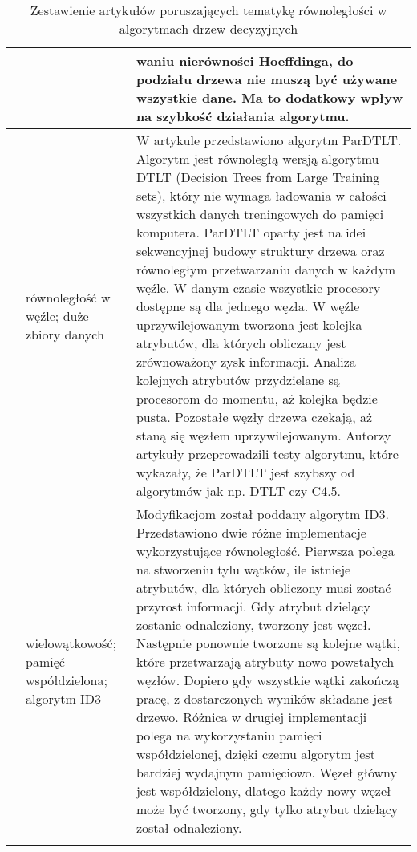 \documentclass[12pt]{article}
\begin{document}
\begin{center}
\begin{longtable}{| c | p{} | p{} |}
            & 

            &
            waniu nierówności Hoeffdinga, do podziału drzewa nie muszą być
            używane wszystkie dane. Ma to dodatkowy wpływ na szybkość działania algorytmu. \\
            
            \hline

            \cite{parallel-algorithm-to-induce-decision-trees} &

            równoległość w węźle; duże zbiory danych &

            W artykule przedstawiono algorytm ParDTLT. Algorytm jest równoległą wersją algorytmu
            DTLT (Decision Trees from Large Training sets), który nie wymaga ładowania w całości wszystkich danych
            treningowych do pamięci komputera. ParDTLT oparty jest na idei sekwencyjnej budowy struktury
            drzewa oraz równoległym przetwarzaniu danych w każdym węźle. W danym czasie wszystkie procesory
            dostępne są dla jednego węzła. W węźle uprzywilejowanym tworzona jest kolejka atrybutów, dla
            których obliczany jest zrównoważony zysk informacji. Analiza kolejnych
            atrybutów przydzielane są procesorom do momentu, aż kolejka będzie pusta. Pozostałe węzły drzewa czekają, aż
            staną się węzłem uprzywilejowanym. Autorzy artykuły przeprowadzili testy algorytmu, które wykazały, że
            ParDTLT jest szybszy od algorytmów jak np. DTLT czy C4.5. \\

            \hline

            \cite{improved-id3-decision-tree} &

            wielowątkowość; pamięć \newline współdzielona; algorytm ID3 &

            Modyfikacjom został poddany algorytm ID3. Przedstawiono dwie różne implementacje wykorzystujące równoległość.
            Pierwsza polega na stworzeniu tylu wątków, ile istnieje atrybutów, dla których obliczony musi zostać
            przyrost informacji. Gdy atrybut dzielący zostanie odnaleziony, tworzony jest węzeł. Następnie ponownie
            tworzone są kolejne wątki, które przetwarzają atrybuty nowo powstałych węzłów. Dopiero gdy wszystkie wątki
            zakończą pracę, z dostarczonych wyników składane jest drzewo. Różnica w drugiej implementacji polega na 
            wykorzystaniu pamięci współdzielonej, dzięki czemu algorytm jest bardziej wydajnym pamięciowo. 
            Węzeł główny jest współdzielony, dlatego każdy nowy węzeł może być tworzony, gdy tylko atrybut dzielący
            został odnaleziony. \\
            
            \hline

        \caption{Zestawienie artykułów poruszających tematykę równoległości w algorytmach drzew decyzyjnych}
        \label{table:articles-parallel-decision-tree}
 
        \end{longtable}

    \end{center}
\end{document}
